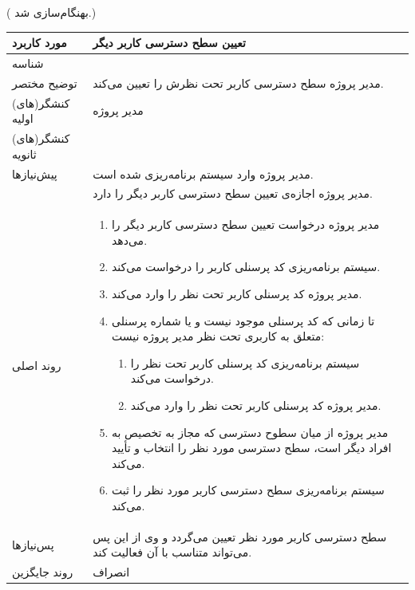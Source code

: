 ({\color{red} بهنگام‌سازی شد.})
\begin{table}[H]
	\centering
	\begin{tabular}{|p{3cm}|p{10cm}|}
		\hline
		مورد کاربرد & تعیین سطح دسترسی کاربر دیگر  \\
		\hline
		شناسه & 
		\stepcounter{usecase_ID}
		\arabic{usecase_ID} \\
		\hline
		توضیح مختصر & مدیر پروژه سطح دسترسی کاربر تحت نظرش را تعیین می‌کند. \\
		\hline
		کنشگر(های) اولیه & مدیر پروژه \\
		\hline
		کنشگر(های) ثانویه &  \\
		\hline
		پیش‌نیازها & مدیر پروژه وارد سیستم برنامه‌ریزی شده است. \\
		& مدیر پروژه اجازه‌ی تعیین سطح دسترسی کاربر دیگر را دارد.\\
		\hline
		
		روند اصلی &
		\begin{enumerate}[topsep=0cm,leftmargin=0.5cm]
			\item مدیر پروژه درخواست تعیین سطح دسترسی کاربر دیگر را می‌دهد. 
			\item سیستم برنامه‌ریزی کد پرسنلی کاربر را درخواست می‌کند. 
			\item مدیر پروژه کد پرسنلی کاربر تحت نظر را وارد می‌کند. 
			\item تا زمانی که کد پرسنلی موجود نیست و یا شماره پرسنلی متعلق به کاربری تحت نظر مدیر پروژه نیست: 
			\begin{enumerate}[topsep=0cm,leftmargin=0.5cm]
				\item سیستم برنامه‌ریزی کد پرسنلی کاربر تحت نظر را درخواست می‌کند.
				\item مدیر پروژه کد پرسنلی کاربر تحت نظر را وارد می‌کند.
			\end{enumerate} 
			\item مدیر پروژه از میان سطوح دسترسی که مجاز به تخصیص به افراد دیگر است، سطح دسترسی مورد نظر را انتخاب و تأ‌یید می‌کند. 
			\item سیستم برنامه‌ریزی سطح دسترسی کاربر مورد نظر را ثبت می‌کند. 
		\end{enumerate} \\
		\hline
		
		پس‌نیازها & سطح دسترسی کاربر مورد نظر تعیین می‌گردد و وی از این پس می‌تواند متناسب با آن فعالیت کند. \\
		\hline
		روند جایگزین & انصراف \\
		\hline
	\end{tabular}
\end{table}


